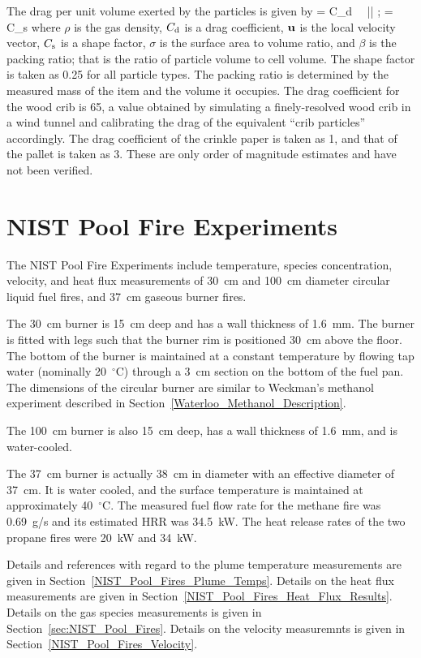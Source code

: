 The drag per unit volume exerted by the particles is given by
\be
    =  C_{\rm d} \, \kappa \, \bu |\bu|   \quad ; \quad \kappa = C_{\rm s} \sigma \beta
\ee
where $\rho$ is the gas density, $C_{\rm d}$ is a drag coefficient, ${\mathbf{u}}$ is the local velocity vector, $C_{\rm s}$ is a shape factor, $\sigma$ is the surface area to volume ratio, and $\beta$ is the packing ratio; that is the ratio of particle volume to cell volume. The shape factor is taken as 0.25 for all particle types. The packing ratio is determined by the measured mass of the item and the volume it occupies. The drag coefficient for the wood crib is 65, a value obtained by simulating a finely-resolved wood crib in a wind tunnel and calibrating the drag of the equivalent ``crib particles'' accordingly. The drag coefficient of the crinkle paper is taken as 1, and that of the pallet is taken as 3. These are only order of magnitude estimates and have not been verified.


\section{NIST Pool Fire Experiments}
\label{NIST_Pool_Fires_Description}

The NIST Pool Fire Experiments include temperature, species concentration, velocity, and heat flux measurements of 30~cm and 100~cm diameter circular liquid fuel fires, and 37~cm gaseous burner fires.

The 30~cm burner is 15~cm deep and has a wall thickness of 1.6~mm. The burner is fitted with legs such that the burner rim is positioned 30~cm above the floor. The bottom of the burner is maintained at a constant temperature by flowing tap water (nominally 20~$^\circ$C) through a 3~cm section on the bottom of the fuel pan. The dimensions of the circular burner are similar to Weckman's methanol experiment described in Section~\ref{Waterloo_Methanol_Description}.

The 100~cm burner is also 15~cm deep, has a wall thickness of 1.6~mm, and is water-cooled.

The 37~cm burner is actually 38~cm in diameter with an effective diameter of 37~cm. It is water cooled, and the surface temperature is maintained at approximately 40~$^\circ$C.  The measured fuel flow rate for the methane fire was 0.69~g/s and its estimated HRR was 34.5~kW. The heat release rates of the two propane fires were 20~kW and 34~kW.

Details and references with regard to the plume temperature measurements are given in Section~\ref{NIST_Pool_Fires_Plume_Temps}. Details on the heat flux measurements are given in Section~\ref{NIST_Pool_Fires_Heat_Flux_Results}. Details on the gas species measurements is given in Section~\ref{sec:NIST_Pool_Fires}. Details on the velocity measuremnts is given in Section~\ref{NIST_Pool_Fires_Velocity}.


